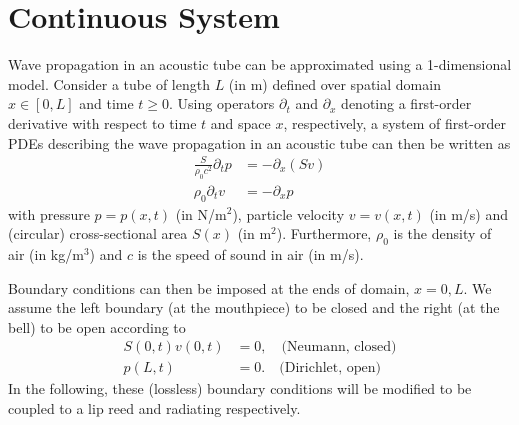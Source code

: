 \section{Continuous System}\label{sec:continuous}
Wave propagation in an acoustic tube can be approximated using a 1-dimensional model. Consider a tube of  length $L$ \SWcomment[$=L(t)$] (in m) defined over spatial domain $x\in [0, L]$ and time $t\geq 0$. Using operators $\partial_t$ and $\partial_x$ denoting a first-order derivative with respect to time $t$ and space $x$, respectively, a system of first-order PDEs describing the wave propagation in an acoustic tube can then be written as
\begin{subequations}\label{eq:firstOrderSystem}
    \begin{align}
        \frac{S}{\rho_0 c^2}\partial_t p &= -\partial_x(Sv)\label{eq:contPressure}\\
        \rho_0\partial_tv &= -\partial_xp\label{eq:contVelocity}
    \end{align}
\end{subequations}
with pressure $p = p(x,t)$ (in N/m$^2$), particle velocity $v = v(x,t)$ (in m/s) and (circular) cross-sectional area $S(x)$ (in m$^2$). Furthermore, $\rho_0$ is the density of air (in kg/m$^3$) and $c$ is the speed of sound in air (in m/s).

Boundary conditions can then be imposed at the ends of domain, $x=0, L$. We assume the left boundary (at the mouthpiece) to be closed and the right (at the bell) to be open according to  
\begin{subequations}\label{eq:contBound}
    \begin{align}
        S(0,t)v(0,t) &= 0, \quad \text{(Neumann, closed)}\label{eq:contNeumann}\\
        p(L,t) &= 0. \quad \text{(Dirichlet, open)}\label{eq:contDirichlet}
    \end{align}
\end{subequations}
In the following, these (lossless) boundary conditions will be modified to be coupled to a lip reed and radiating respectively.

